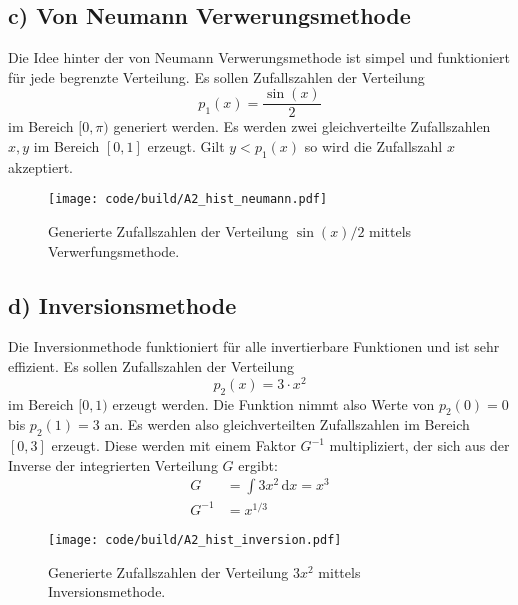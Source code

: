 \subsection{c) Von Neumann Verwerungsmethode}
Die Idee hinter der von Neumann Verwerungsmethode ist simpel und funktioniert für jede begrenzte Verteilung.
Es sollen Zufallszahlen der Verteilung
\begin{equation}
    p_1(x) = \frac{\sin(x)}{2}
\end{equation}
im Bereich $[0, \pi)$ generiert werden.
Es werden zwei gleichverteilte Zufallszahlen $x, y$ im Bereich $[0,1]$ erzeugt.
Gilt $y < p_1(x)$ so wird die Zufallszahl $x$ akzeptiert.
\begin{figure}
    \centering
    \texttt{[image: code/build/A2\_hist\_neumann.pdf]}
    \caption{Generierte Zufallszahlen der Verteilung $\sin(x)/2$ mittels Verwerfungsmethode.}
\end{figure}
\FloatBarrier

\subsection{d) Inversionsmethode}
Die Inversionmethode funktioniert für alle invertierbare Funktionen und ist sehr effizient.
Es sollen Zufallszahlen der Verteilung
\begin{equation}
    p_2(x) = 3 \cdot x^2
\end{equation}
im Bereich $[0, 1)$ erzeugt werden.
Die Funktion nimmt also Werte von $p_2(0)=0$ bis $p_2(1)=3$ an.
Es werden also gleichverteilten Zufallszahlen im Bereich $[0,3]$ erzeugt.
Diese werden mit einem Faktor $G^{-1}$ multipliziert, der sich aus der Inverse der integrierten Verteilung $G$ ergibt:
\begin{align*}
    G &= \int 3 x^2 \, \mathrm{d}x = x^3 \\
    G^{-1} &= x^{1/3}
\end{align*}
\begin{figure}
    \centering
    \texttt{[image: code/build/A2\_hist\_inversion.pdf]}
    \caption{Generierte Zufallszahlen der Verteilung $3x^2$ mittels Inversionsmethode.}
\end{figure}
\FloatBarrier

